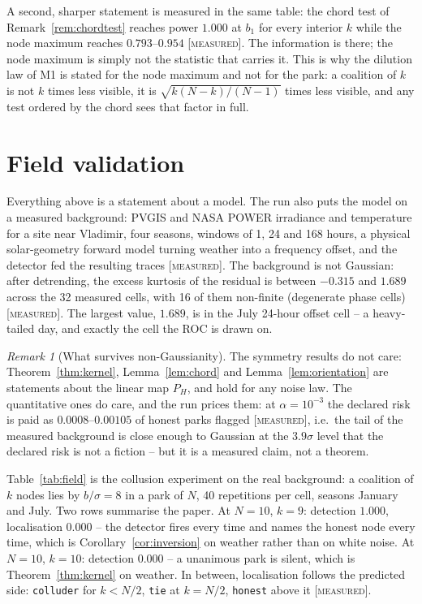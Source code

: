 \documentclass[10pt,twocolumn,a4paper]{article}
\newcommand{\measured}{\textcolor{blue!70!black}{\textsc{[measured]}}}
\theoremstyle{definition}
\theoremstyle{remark}
\newtheorem{remark}[theorem]{Remark}
\newcommand{\PH}{P_{H}}
\begin{document}
A second, sharper statement is measured in the same table: the chord test of
Remark~\ref{rem:chordtest} reaches power $1.000$ at $b_1$ for every interior $k$
while the node maximum reaches $0.793$--$0.954$ \measured. The information is
there; the node maximum is simply not the statistic that carries it. This is why
the dilution law of M1 is stated for the node maximum and not for the park: a
coalition of $k$ is not $k$ times less visible, it is $\sqrt{k(N-k)/(N-1)}$ times
less visible, and any test ordered by the chord sees that factor in full.



\section{Field validation}
\label{sec:field}

Everything above is a statement about a model. The run also puts the model on a
measured background: PVGIS \cite{pvgis} and NASA POWER \cite{nasa} irradiance and
temperature for a site
near Vladimir, four seasons, windows of 1, 24 and 168 hours, a physical
solar-geometry forward model turning weather into a frequency offset, and the
detector fed the resulting traces \measured. The background is not Gaussian: after
detrending, the excess kurtosis of the residual is between $-0.315$ and $1.689$
across the 32 measured cells, with 16 of them non-finite (degenerate phase cells)
\measured. The largest value, $1.689$, is in the July 24-hour offset cell -- a
heavy-tailed day, and exactly the cell the ROC is drawn on.

\begin{remark}[What survives non-Gaussianity]
The symmetry results do not care: Theorem~\ref{thm:kernel},
Lemma~\ref{lem:chord} and Lemma~\ref{lem:orientation} are statements about the
linear map $\PH$, and hold for any noise law. The quantitative ones do care, and
the run prices them: at $\alpha=10^{-3}$ the declared risk is paid as
$0.0008$--$0.00105$ of honest parks flagged \measured{}, i.e.\ the tail of the
measured background is close enough to Gaussian at the $3.9\sigma$ level that the
declared risk is not a fiction -- but it is a measured claim, not a theorem.
\end{remark}

Table~\ref{tab:field} is the collusion experiment on the real background: a
coalition of $k$ nodes lies by $b/\sigma=8$ in a park of $N$, 40 repetitions per
cell, seasons January and July. Two rows summarise the paper. At $N=10$, $k=9$:
detection $1.000$, localisation $0.000$ -- the detector fires every time and
names the honest node every time, which is
Corollary~\ref{cor:inversion} on weather rather than on white noise. At $N=10$,
$k=10$: detection $0.000$ -- a unanimous park is silent, which is
Theorem~\ref{thm:kernel} on weather. In between, localisation follows the
predicted side: \texttt{colluder} for $k<N/2$, \texttt{tie} at $k=N/2$,
\texttt{honest} above it \measured.
\end{document}
